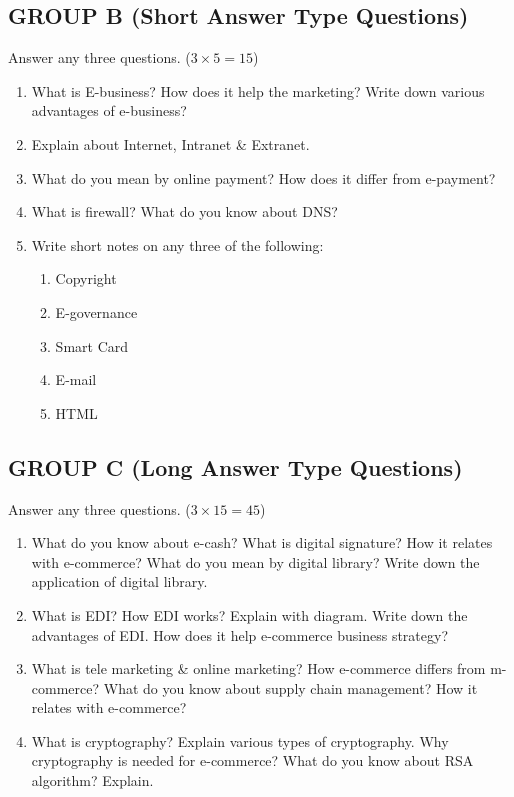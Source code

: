\documentclass{article}
\begin{document}
\subsection*{GROUP B (Short Answer Type Questions)}
Answer any three questions. ($3 \times 5 = 15$)
\begin{enumerate}
    \item[2.] What is E-business? How does it help the marketing? Write down various advantages of e-business?
    \item[3.] Explain about Internet, Intranet \& Extranet.
    \item[4.] What do you mean by online payment? How does it differ from e-payment?
    \item[5.] What is firewall? What do you know about DNS?
    \item[6.] Write short notes on any three of the following:
    \begin{enumerate}
        \item[a)] Copyright
        \item[b)] E-governance
        \item[c)] Smart Card
        \item[d)] E-mail
        \item[e)] HTML
    \end{enumerate}
\end{enumerate}

\subsection*{GROUP C (Long Answer Type Questions)}
Answer any three questions. ($3 \times 15 = 45$)
\begin{enumerate}
    \item[7.] What do you know about e-cash? What is digital signature? How it relates with e-commerce? What do you mean by digital library? Write down the application of digital library.
    \item[8.] What is EDI? How EDI works? Explain with diagram. Write down the advantages of EDI. How does it help e-commerce business strategy?
    \item[9.] What is tele marketing \& online marketing? How e-commerce differs from m-commerce? What do you know about supply chain management? How it relates with e-commerce?
    \item[10.] What is cryptography? Explain various types of cryptography. Why cryptography is needed for e-commerce? What do you know about RSA algorithm? Explain.
\end{enumerate}
\end{document}
